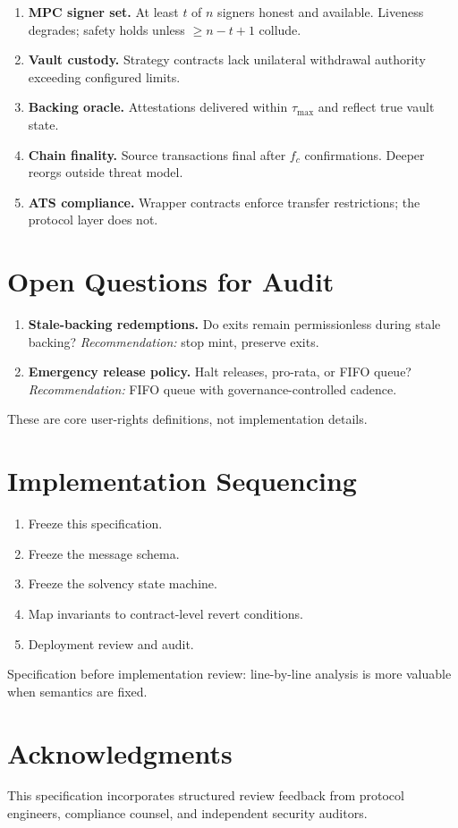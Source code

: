 \documentclass[11pt,twocolumn]{article}
\theoremstyle{remark}
\begin{document}
\begin{enumerate}
  \item \textbf{MPC signer set.} At least $t$ of $n$ signers honest and available. Liveness degrades; safety holds unless $\geq n - t + 1$ collude.
  \item \textbf{Vault custody.} Strategy contracts lack unilateral withdrawal authority exceeding configured limits.
  \item \textbf{Backing oracle.} Attestations delivered within $\tau_{\max}$ and reflect true vault state.
  \item \textbf{Chain finality.} Source transactions final after $f_c$ confirmations. Deeper reorgs outside threat model.
  \item \textbf{ATS compliance.} Wrapper contracts enforce transfer restrictions; the protocol layer does not.
\end{enumerate}


\section{Open Questions for Audit}
\label{sec:open}

\begin{enumerate}
  \item \textbf{Stale-backing redemptions.} Do exits remain permissionless during stale backing? \emph{Recommendation:} stop mint, preserve exits.
  \item \textbf{Emergency release policy.} Halt releases, pro-rata, or FIFO queue? \emph{Recommendation:} FIFO queue with governance-controlled cadence.
\end{enumerate}

These are core user-rights definitions, not implementation details.


\section{Implementation Sequencing}
\label{sec:sequencing}

\begin{enumerate}[nosep]
  \item Freeze this specification.
  \item Freeze the message schema.
  \item Freeze the solvency state machine.
  \item Map invariants to contract-level revert conditions.
  \item Deployment review and audit.
\end{enumerate}

Specification before implementation review: line-by-line analysis is more valuable when semantics are fixed.


\section*{Acknowledgments}

This specification incorporates structured review feedback from protocol engineers, compliance counsel, and independent security auditors.



\end{document}
